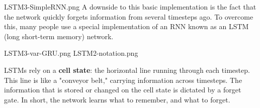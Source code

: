 \documentclass[]{article}
\begin{document}
  LSTM3-SimpleRNN.png
A downside to this basic implementation is the fact that the network quickly forgets information from several timesteps ago. To overcome this, many people use a special implementation of an RNN known as an LSTM (long short-term memory) network.

  LSTM3-var-GRU.png
  LSTM2-notation.png
  
LSTMs rely on a \textbf{cell state}: the horizontal line running through each timestep. This line is like a "conveyor belt," carrying information across timesteps. The information that is stored or changed on the cell state is dictated by a forget gate. In short, the network learns what to remember, and what to forget.
\end{document}
